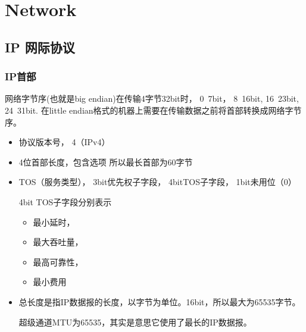 \chapter{Network}


\section{IP 网际协议}

\subsection{IP首部}


网络字节序(也就是big endian)在传输4字节32bit时， 0~7bit， 8~16bit, 16~23bit, 24~31bit. 在little endian格式的机器上需要在传输数据之前将首部转换成网络字节序。

\begin{itemize}
\item 协议版本号， 4（IPv4）
\item 4位首部长度，包含选项 所以最长首部为60字节
\item TOS（服务类型）， 3bit优先权子字段， 4bitTOS子字段， 1bit未用位（0）

4bit TOS子字段分别表示
\begin{itemize}
\item 最小延时， 
\item 最大吞吐量， 
\item 最高可靠性， 
\item 最小费用
\end{itemize}

\item 总长度是指IP数据报的长度，以字节为单位。16bit，所以最大为65535字节。

超级通道MTU为65535，其实是意思它使用了最长的IP数据报。 
\end{itemize}



